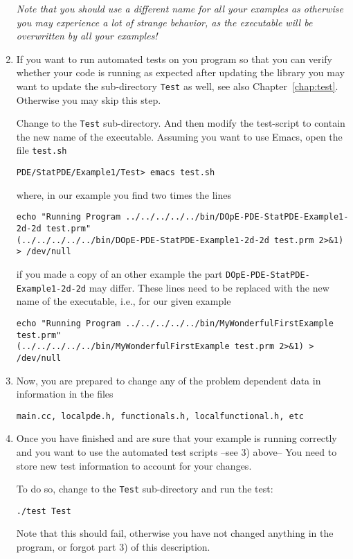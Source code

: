 \begin{enumerate}
\textit{Note that you should use a different name for all your 
examples as otherwise you may experience a lot of strange behavior, as
the executable will be overwritten by all your examples!}

\item If you want to run automated tests on you program so that you can 
  verify whether your code is running as expected after updating the 
  library you may want to update the sub-directory \texttt{Test} 
  as well, see also Chapter~\ref{chap:test}. Otherwise you may skip this 
  step.

  Change to the \texttt{Test} sub-directory. And then modify the
  test-script to contain the new name of the executable.
  Assuming you want to use Emacs, open the file \texttt{test.sh}
\begin{verbatim}
PDE/StatPDE/Example1/Test> emacs test.sh
\end{verbatim}
where, in our example you find two times the lines
\begin{verbatim}
echo "Running Program ../../../../../bin/DOpE-PDE-StatPDE-Example1-2d-2d test.prm"
(../../../../../bin/DOpE-PDE-StatPDE-Example1-2d-2d test.prm 2>&1) > /dev/null
\end{verbatim} 
if you made a copy of an other example the part \texttt{DOpE-PDE-StatPDE-Example1-2d-2d}
may differ. These lines need to be replaced with the new name of the 
executable, i.e., for our given example
\begin{verbatim}
echo "Running Program ../../../../../bin/MyWonderfulFirstExample test.prm"
(../../../../../bin/MyWonderfulFirstExample test.prm 2>&1) > /dev/null
\end{verbatim} 

\item  Now, you are prepared to change any of the problem
  dependent data in information in the files 
\begin{verbatim}
main.cc, localpde.h, functionals.h, localfunctional.h, etc
\end{verbatim} 

\item Once you have finished and are sure that your example is running correctly
  and you want to use the automated test scripts --see 3) above-- You need 
  to store new test information to account for your changes. 
  
  To do so, change to the \texttt{Test} sub-directory and run the test:
\begin{verbatim}
./test Test
\end{verbatim}
  Note that this should fail, otherwise you have not changed anything in the program, 
  or forgot part 3) of this description.
  

\end{enumerate}
